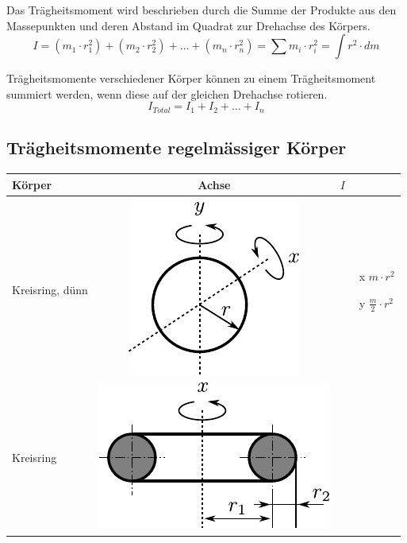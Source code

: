 Das Trägheitsmoment wird beschrieben durch die Summe der 
Produkte aus den Massepunkten und deren Abstand im Quadrat zur 
Drehachse des Körpers.
\[ \boxed{
	I = \left(m_1 \cdot r_1^2 \right)
		+ \left( m_2 \cdot r_2^2 \right)
		+ \dots 
		+ \left( m_n \cdot r_n^2 \right)
		= \sum m_i \cdot r_i^2
		= \int r^2 \cdot dm
} \]

\noindent
Trägheitsmomente verschiedener Körper können zu einem Trägheitsmoment
summiert werden, wenn diese auf der gleichen Drehachse rotieren.
\[ \boxed{
	I_{Total} = I_1 + I_2 + \dots + I_n
} \]

\newpage
\subsection{Trägheitsmomente regelmässiger Körper}

\begin{table}[h!]
\centering
\begin{tabular}{m{2cm} c m{}}
Körper	& Achse	& $I$ \\
\hline
& & \\
Kreisring, dünn &
	\begin{minipage}{0.3\textwidth}
	\centering
	\includegraphics[scale=\traegscale]{traeg-kreisring-duenn.pdf}
	\end{minipage} &
		\begin{itemize}
		\item[x] $m \cdot r^2$
		\item[y] $\frac{m}{2} \cdot r^2$
		\end{itemize} \\
Kreisring &
	\begin{minipage}{0.3\textwidth}
	\centering
	\includegraphics[scale=\traegscale]{traeg-kreisring.pdf}

\end{minipage}
\end{tabular}
\end{table}
